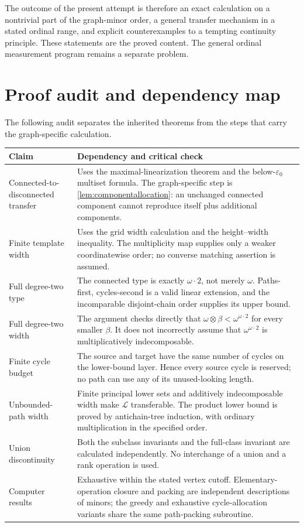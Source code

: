 \documentclass[11pt,letterpaper]{article}
\theoremstyle{plain}
\theoremstyle{definition}
\theoremstyle{remark}
\newcommand{\LF}{\mathcal L}
\newcommand{\eps}{\varepsilon}
\begin{document}
The outcome of the present attempt is therefore an exact calculation
on a nontrivial part of the graph-minor order, a general transfer
mechanism in a stated ordinal range, and explicit counterexamples
to a tempting continuity principle. These statements are the proved
content. The general ordinal measurement program remains a separate
problem.

\clearpage
\appendix
\section{Proof audit and dependency map}\label{app:audit}

The following audit separates the inherited theorems from the steps
that carry the graph-specific calculation.

\begin{longtable}{@{}p{}p{}@{}}
\toprule
Claim & Dependency and critical check\\
\midrule
\endhead
Connected-to-disconnected transfer &
Uses the maximal-linearization theorem and the below-$\eps_0$
multiset formula. The graph-specific step is
\cref{lem:componentallocation}: an unchanged connected component
cannot reproduce itself plus additional components.\\[0.6em]
Finite template width &
Uses the grid width calculation and the height--width inequality.
The multiplicity map supplies only a weaker coordinatewise order;
no converse matching assertion is assumed.\\[0.6em]
Full degree-two type &
The connected type is exactly $\omega\cdot2$, not merely $\omega$.
Paths-first, cycles-second is a valid linear extension, and the
incomparable disjoint-chain order supplies its upper bound.\\[0.6em]
Full degree-two width &
The argument checks directly that
$\omega\otimes\beta<\omega^{\omega\cdot2}$ for every smaller
$\beta$. It does not incorrectly assume that
$\omega^{\omega\cdot2}$ is multiplicatively indecomposable.\\[0.6em]
Finite cycle budget &
The source and target have the same number of cycles on the
lower-bound layer. Hence every source cycle is reserved; no path
can use any of its unused-looking length.\\[0.6em]
Unbounded-path width &
Finite principal lower sets and additively indecomposable width
make $\LF$ transferable. The product lower bound is proved by
antichain-tree induction, with ordinary multiplication in the
specified order.\\[0.6em]
Union discontinuity &
Both the subclass invariants and the full-class invariant are
calculated independently. No interchange of a union and a
rank operation is used.\\[0.6em]
Computer results &
Exhaustive within the stated vertex cutoff. Elementary-operation
closure and packing are independent descriptions of minors;
the greedy and exhaustive cycle-allocation variants share the
same path-packing subroutine.\\
\bottomrule
\end{longtable}
\end{document}
